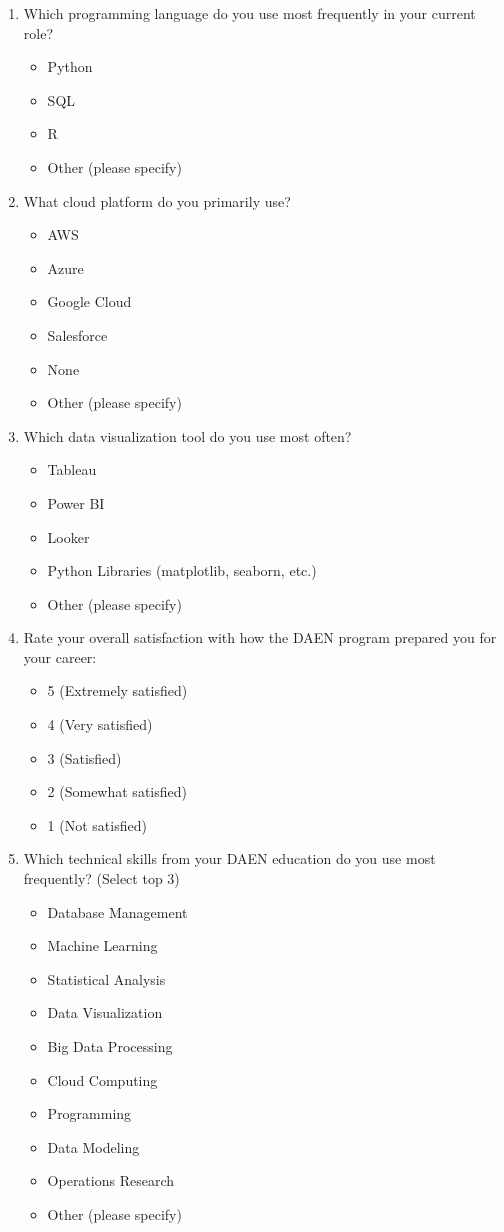 \documentclass[12pt,a4paper]{article}
\begin{document}
\begin{enumerate}
\item Which programming language do you use most frequently in your current role?
\begin{itemize}
    \item Python
    \item SQL
    \item R
    \item Other (please specify)
\end{itemize}

\item What cloud platform do you primarily use?
\begin{itemize}
    \item AWS
    \item Azure
    \item Google Cloud
    \item Salesforce
    \item None
    \item Other (please specify)
\end{itemize}

\item Which data visualization tool do you use most often?
\begin{itemize}
    \item Tableau
    \item Power BI
    \item Looker
    \item Python Libraries (matplotlib, seaborn, etc.)
    \item Other (please specify)
\end{itemize}

\item Rate your overall satisfaction with how the DAEN program prepared you for your career:
\begin{itemize}
    \item 5 (Extremely satisfied)
    \item 4 (Very satisfied)
    \item 3 (Satisfied)
    \item 2 (Somewhat satisfied)
    \item 1 (Not satisfied)
\end{itemize}

\item Which technical skills from your DAEN education do you use most frequently? (Select top 3)
\begin{itemize}
    \item Database Management
    \item Machine Learning
    \item Statistical Analysis
    \item Data Visualization
    \item Big Data Processing
    \item Cloud Computing
    \item Programming
    \item Data Modeling
    \item Operations Research
    \item Other (please specify)
\end{itemize}


\end{enumerate}
\end{document}
